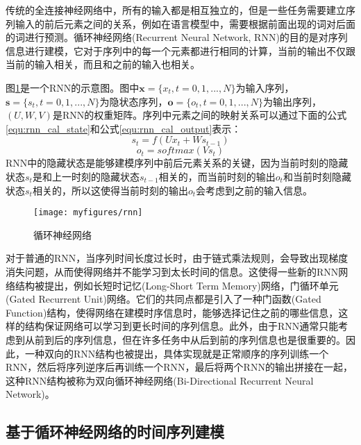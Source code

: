 传统的全连接神经网络中，所有的输入都是相互独立的，但是一些任务需要建立序列输入的前后元素之间的关系，例如在语言模型中，需要根据前面出现的词对后面的词进行预测。循环神经网络(Recurrent Neural Network, RNN)的目的是对序列信息进行建模，它对于序列中的每一个元素都进行相同的计算，当前的输出不仅跟当前的输入相关，而且和之前的输入也相关。

图\ref{fig:rnn}是一个RNN的示意图。图中$\mathbf{x}=\{x_t, t=0,1,...,N\}$为输入序列，$\mathbf{s}=\{s_t, t=0,1,...,N\}$为隐状态序列，$\mathbf{o}=\{o_t, t=0,1,...,N\}$为输出序列，$(U, W, V)$是RNN的权重矩阵。序列中元素之间的映射关系可以通过下面的公式\ref{equ:rnn_cal_state}和公式\ref{equ:rnn_cal_output}表示：
\begin{equation}
\label{equ:rnn_cal_state}
    s_t = f(Ux_t + Ws_{t-1})
\end{equation}
\begin{equation}
\label{equ:rnn_cal_output}
    o_t = softmax(Vs_t)
\end{equation}
RNN中的隐藏状态是能够建模序列中前后元素关系的关键，因为当前时刻的隐藏状态$s_t$是和上一时刻的隐藏状态$s_{t-1}$相关的，而当前时刻的输出$o_t$和当前时刻隐藏状态$s_t$相关的，所以这使得当前时刻的输出$o_t$会考虑到之前的输入信息。

\begin{figure}[htb] %
    \vspace{-0.8cm}  %
    \setlength{\belowcaptionskip}{0cm}   %
    \centering
    \texttt{[image: myfigures/rnn]}
    \caption{循环神经网络}
    \label{fig:rnn}
\end{figure}

对于普通的RNN，当序列时间长度过长时，由于链式乘法规则，会导致出现梯度消失问题，从而使得网络并不能学习到太长时间的信息。这使得一些新的RNN网络结构被提出，例如长短时记忆(Long-Short Term Memory)网络，门循环单元(Gated Recurrent Unit)网络。它们的共同点都是引入了一种门函数(Gated Function)结构，使得网络在建模时序信息时，能够选择记住之前的哪些信息，这样的结构保证网络可以学习到更长时间的序列信息。此外，由于RNN通常只能考虑到从前到后的序列信息，但在许多任务中从后到前的序列信息也是很重要的。因此，一种双向的RNN结构也被提出，具体实现就是正常顺序的序列训练一个RNN，然后将序列逆序后再训练一个RNN，最后将两个RNN的输出拼接在一起，这种RNN结构被称为双向循环神经网络(Bi-Directional Recurrent Neural Network)。

\subsection{基于循环神经网络的时间序列建模}
\label{ssec:rnn_seq_model_detail}

